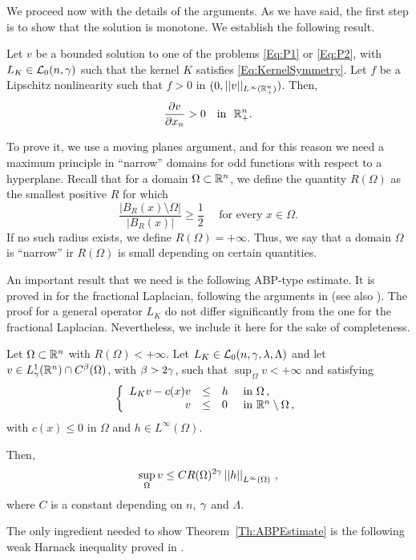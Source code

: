 We proceed now with the details of the arguments. As we have said, the first step is to show that the solution is monotone. We establish the following result.

\begin{proposition}
	\label{Prop:MonotonyHalfSpace}
	Let $v$ be a bounded solution to one of the problems \eqref{Eq:P1} or \eqref{Eq:P2}, with $L_K \in \mathcal{L}_0(n,\gamma)$ such that the kernel $K$ satisfies \eqref{Eq:KernelSymmetry}. Let $f$ be a Lipschitz nonlinearity such that $f>0$ in $(0,||v||_{L^\infty(\mathbb{R}^n_+)})$. Then,
	$$
	\frac{\partial v}{\partial x_n} > 0 \,\,\,\, \text{ in } \,\,\mathbb{R}^n_+.
	$$
\end{proposition}

To prove it, we use a moving planes argument, and for this reason we need a maximum principle in ``narrow'' domains for odd functions with respect to a hyperplane. Recall that for a domain $\Omega \subset \mathbb{R}^n$, we define the quantity $R(\Omega)$ as the smallest positive $R$ for which
$$
\dfrac{|B_R(x)\setminus \Omega|}{|B_R(x)|}\geq \dfrac{1}{2} \quad \text{ for every } x \in \Omega.
$$
If no such radius exists, we define $R(\Omega) = +\infty$. Thus, we say that a domain $\Omega$ is ``narrow'' ir $R(\Omega)$ is small depending on certain quantities.

An important result that we need is the following ABP-type estimate. It is proved in \cite{QuaasXia} for the fractional Laplacian, following the arguments in \cite{Cabre-ABP} (see also \cite{Cabre-Topics}). The proof for a general operator $L_K$ do not differ significantly from the one for the fractional Laplacian. Nevertheless, we include it here for the sake of completeness.

\begin{theorem}
	\label{Th:ABPEstimate}
	Let $\Omega \subset \mathbb{R}^n$ with $R(\Omega) < +\infty$. Let $L_K \in \mathcal{L}_0(n,\gamma,\lambda, \Lambda)$ and let $v\in L^1_\gamma(\mathbb{R}^n)\cap C^{\beta}(\Omega)$, with $\beta > 2\gamma$, such that $\sup_{\Omega} v < +\infty$ and satisfying
	$$
	\left\{\begin{array}{rcll}
	L_K v - c(x)v &\leq & h & \text{ in } \Omega\,, \\
	v & \leq & 0 & \text{ in } \mathbb{R}^n\setminus \Omega\,,
	\end{array} \right.
	$$
	with $c(x)\leq 0$ in $\Omega$ and $h\in L^\infty(\Omega)$.
	
	Then,
	$$
	\sup_\Omega v \leq C R(\Omega)^{2\gamma} \left | \left |{h} \right | \right |_{L^{\infty}(\Omega)}\,,
	$$
	where $C$ is a constant depending on $n$, $\gamma$ and $\Lambda$.
\end{theorem}


The only ingredient needed to show Theorem~\ref{Th:ABPEstimate} is the following weak Harnack inequality proved in  \cite{Cozzi-DeGiorgiClassesShort}.

